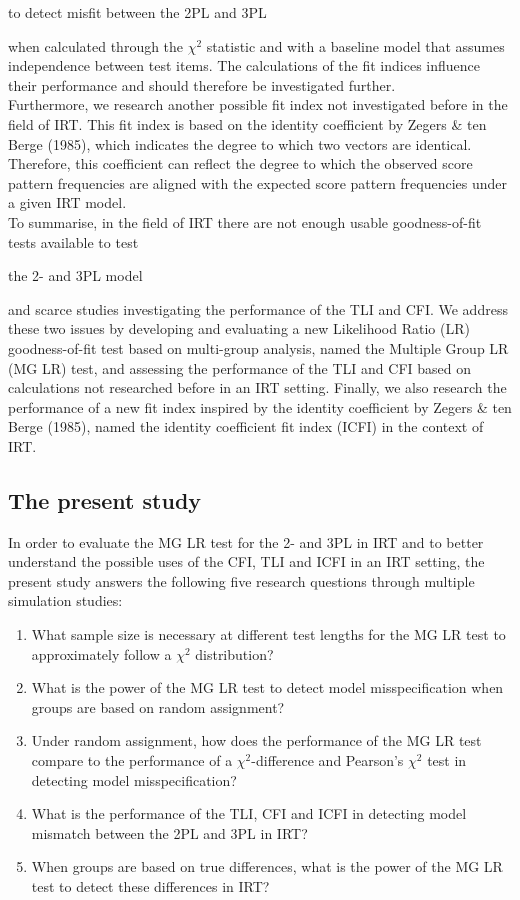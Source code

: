 \documentclass[Royal,sageapa,times,doublespace]{sagej}
\begin{document}
to detect misfit between the 2PL and 3PL %


when calculated through the $\chi^2$ statistic and with a baseline model that assumes independence between test items. The calculations of the fit indices influence their performance and should therefore be investigated further. \\
\indent Furthermore, we research another possible fit index not investigated before in the field of IRT. This fit index is based on the identity coefficient by Zegers \& ten Berge (1985), which indicates the degree to which two vectors are identical. Therefore, this coefficient can reflect the degree to which the observed score pattern frequencies are aligned with the expected score pattern frequencies under a given IRT model. \\
\indent To summarise, in the field of IRT there are not enough usable goodness-of-fit tests available to test 

the 2- and 3PL model %

and scarce studies investigating the performance of the TLI and CFI. We address these two issues by developing and evaluating a new Likelihood Ratio (LR) goodness-of-fit test based on multi-group analysis, named the Multiple Group LR (MG LR) test, and assessing the performance of the TLI and CFI based on calculations not researched before in an IRT setting. Finally, we also research the performance of a new fit index inspired by the identity coefficient by Zegers \& ten Berge (1985), named the identity coefficient fit index (ICFI) in the context of IRT.

\subsection{The present study}
In order to evaluate the MG LR test for the 2- and 3PL in IRT and to better understand the possible uses of the CFI, TLI  and ICFI in an IRT setting, the present study answers the following five research questions through multiple simulation studies:
\begin{enumerate}
\item{What sample size is necessary at different test lengths for the MG LR test to approximately follow a $\chi^2$ distribution?}
\item{What is the power of the MG LR test to detect model misspecification when groups are based on random assignment?}
\item{Under random assignment, how does the performance of the MG LR test compare to the performance of a $\chi^2$-difference and Pearson's $\chi^2$ test in detecting model misspecification?}


\item{What is the performance of the TLI, CFI and ICFI in detecting model mismatch between the 2PL and 3PL in IRT?}

\item{When groups are based on true differences, what is the power of the MG LR test to detect these differences in IRT?}
\end{enumerate}
\end{document}
